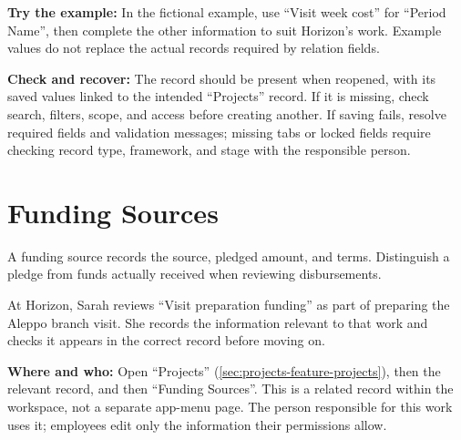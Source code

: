 \textbf{Try the example:} In the fictional example, use “Visit week cost” for “Period Name”, then complete the other information to suit Horizon's work. Example values do not replace the actual records required by relation fields.

\textbf{Check and recover:} The record should be present when reopened, with its saved values linked to the intended “Projects” record. If it is missing, check search, filters, scope, and access before creating another. If saving fails, resolve required fields and validation messages; missing tabs or locked fields require checking record type, framework, and stage with the responsible person.

\clearpage
\section{Funding Sources}
\label{sec:projects-feature-funding-sources}

A funding source records the source, pledged amount, and terms. Distinguish a pledge from funds actually received when reviewing disbursements.

\begin{rcnote}
At Horizon, Sarah reviews “Visit preparation funding” as part of preparing the Aleppo branch visit. She records the information relevant to that work and checks it appears in the correct record before moving on.
\end{rcnote}

\textbf{Where and who:} Open “Projects” (\ref{sec:projects-feature-projects}), then the relevant record, and then “Funding Sources”. This is a related record within the workspace, not a separate app-menu page. The person responsible for this work uses it; employees edit only the information their permissions allow.


